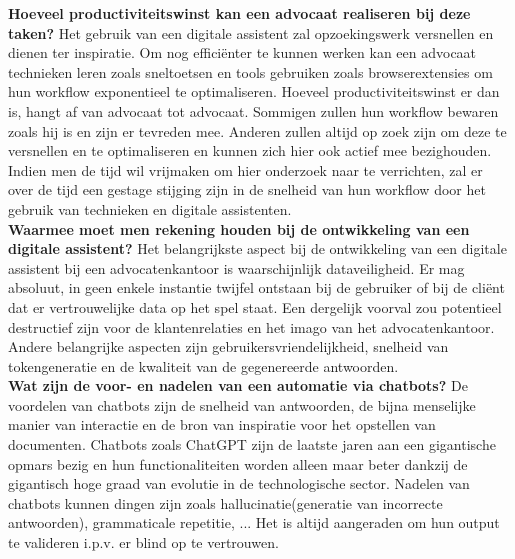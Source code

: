 \textbf{Hoeveel productiviteitswinst kan een advocaat realiseren bij deze taken?}
Het gebruik van een digitale assistent zal opzoekingswerk versnellen en dienen ter inspiratie. 
Om nog efficiënter te kunnen werken kan een advocaat technieken leren zoals sneltoetsen en tools gebruiken zoals browserextensies om hun workflow exponentieel te optimaliseren. 
Hoeveel productiviteitswinst er dan is, hangt af van advocaat tot advocaat. 
Sommigen zullen hun workflow bewaren zoals hij is en zijn er tevreden mee. 
Anderen zullen altijd op zoek zijn om deze te versnellen en te optimaliseren en kunnen zich hier ook actief mee bezighouden. 
Indien men de tijd wil vrijmaken om hier onderzoek naar te verrichten, zal er over de tijd een gestage stijging 
zijn in de snelheid van hun workflow door het gebruik van technieken en digitale assistenten. \\ 

\textbf{Waarmee moet men rekening houden bij de ontwikkeling van een digitale assistent?}
Het belangrijkste aspect bij de ontwikkeling van een digitale assistent bij een advocatenkantoor is waarschijnlijk dataveiligheid. 
Er mag absoluut, in geen enkele instantie twijfel ontstaan bij de gebruiker of bij de cliënt dat er vertrouwelijke data op het spel staat.  
Een dergelijk voorval zou potentieel destructief zijn voor de klantenrelaties en het imago van het advocatenkantoor. 
Andere belangrijke aspecten zijn gebruikersvriendelijkheid, snelheid van tokengeneratie en de kwaliteit van de gegenereerde antwoorden.\\ 

\textbf{Wat zijn de voor- en nadelen van een automatie via chatbots?}
De voordelen van chatbots zijn de snelheid van antwoorden, de bijna menselijke manier van interactie en de bron van inspiratie voor het opstellen van documenten. 
Chatbots zoals ChatGPT zijn de laatste jaren aan een gigantische opmars bezig en hun functionaliteiten worden alleen maar beter dankzij de gigantisch hoge graad van evolutie in de technologische sector. 
Nadelen van chatbots kunnen dingen zijn zoals hallucinatie(generatie van incorrecte antwoorden), grammaticale repetitie, ... 
Het is altijd aangeraden om hun output te valideren i.p.v. er blind op te vertrouwen. 
